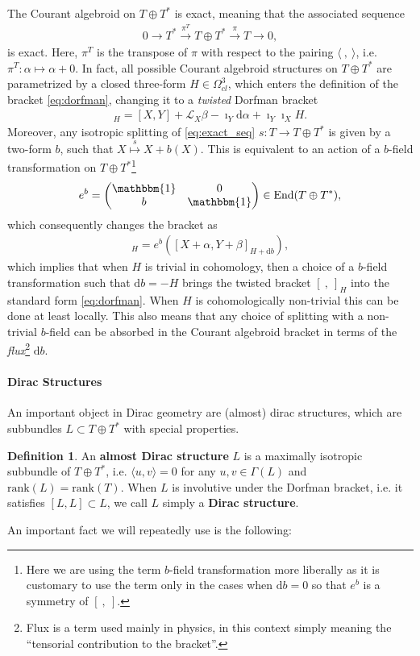 \documentclass{article}
\newcommand{\TT}{{T\oplus T^*}}
\newcommand{\id}{\mathbbm{1}}
\newcommand{\Lie}{\mathcal{L}}
\newcommand{\ap}{\alpha}
\newcommand{\bt}{\beta}
\newcommand{\rd}{\mathrm{d}}
\newcommand{\se}{\Gamma}
\newcommand{\la}{\langle}
\newcommand{\ra}{\rangle}
\newcommand{\lara}{\la\ ,\ \ra}
\newcommand{\brac}{[\ ,\ ]}
\theoremstyle{definition}
\newtheorem{Def}[theorem]{Definition}
\theoremstyle{remark}
\DeclareMathOperator{\End}{End}
\begin{document}
The Courant algebroid on $\TT$ is exact, meaning that the associated sequence
\begin{align}\label{eq:exact_seq}
0\longrightarrow T^* \overset{\pi^T}{\longrightarrow} \TT\overset{\pi}{\longrightarrow} T\longrightarrow 0,
\end{align}
is exact. Here, $\pi^T$ is the transpose of $\pi$ with respect to the pairing $\lara$,
i.e. $\pi^T: \ap \mapsto \ap+0$. In fact, all possible Courant algebroid structures on $\TT$ are parametrized by a closed three-form $H\in \Omega^3_{cl}$, which enters the definition of the bracket \eqref{eq:dorfman}, changing it to a {\it twisted} Dorfman bracket
\begin{align*}
[ X+\ap,Y+\bt]_H=[X,Y]+\Lie_X\bt-\imath_Y\rd \ap+\imath_Y\imath_X H.
\end{align*}
Moreover, any isotropic splitting of \eqref{eq:exact_seq} $s:T\rightarrow \TT$ is given by a two-form $b$, such that $X\overset{s}{\mapsto}X+b(X)$. This is equivalent to an action of a $b$-field transformation on $\TT$\footnote{Here we are using the term $b$-field transformation more liberally as it is customary to use the term only in the cases when $\rd b=0$ so that $e^b$ is a symmetry of $\brac$.}
\begin{align*}
e^b=
\begin{pmatrix}
\id & 0 \\
b & \id
\end{pmatrix}
\in \End(\TT),
\end{align*}
which consequently changes the bracket as
\begin{align*}
[ e^b(X+\ap),e^b(Y+\bt)]_H=e^b([ X+\ap,Y+\bt]_{H+\rd b}),
\end{align*}
which implies that when $H$ is trivial in cohomology, then a choice of a $b$-field transformation such that $\rd b=-H$ brings the twisted bracket $\brac_H$ into the standard form \eqref{eq:dorfman}. When $H$ is cohomologically non-trivial this can be done at least locally. This also means that any choice of splitting with a non-trivial $b$-field can be absorbed in the Courant algebroid bracket in terms of the {\it flux}\footnote{Flux is a term used mainly in physics, in this context simply meaning the ``tensorial contribution to the bracket''.} $\rd b$.

\paragraph{Dirac Structures}
An important object in Dirac geometry are (almost) dirac structures, which are subbundles $L\subset \TT$ with special properties.
\begin{Def}
An {\bf almost Dirac structure} $L$ is a maximally isotropic subbundle of $\TT$, i.e. $\la u,v\ra=0$ for any $u,v \in \se(L)$ and $\text{rank}(L)=\text{rank}(T)$. When $L$ is involutive under the Dorfman bracket, i.e. it satisfies $[L,L]\subset L$, we call $L$ simply a {\bf Dirac structure}.
\end{Def}
An important fact we will repeatedly use is the following:
\end{document}

